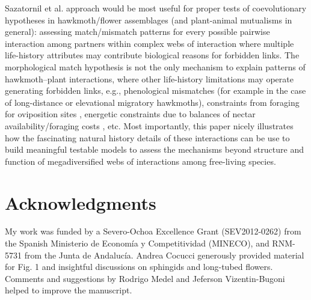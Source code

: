\documentclass[a4paper,12pt]{article}
\begin{document}
Sazatornil et al. approach would be most useful for proper tests of coevolutionary hypotheses in hawkmoth/flower assemblages (and plant-animal mutualisms in general): assessing match/mismatch patterns for every possible pairwise interaction among partners within complex webs of interaction where multiple life-history attributes may contribute biological reasons for forbidden links. The morphological match hypothesis is not the only mechanism to explain patterns of hawkmoth–plant interactions, where other life-history limitations may operate generating forbidden links, e.g., phenological mismatches (for example in the case of long-distance or elevational migratory hawkmoths), constraints from foraging for oviposition sites \citep{Alarcon:2008}, energetic constraints due to balances of nectar availability/foraging costs \citep{Borrell:2005}, etc. Most importantly, this paper nicely illustrates how the fascinating natural history details of these interactions can be use to build meaningful testable models to assess the mechanisms beyond structure and function of megadiversified webs of interactions among free-living species.


\section*{Acknowledgments}

My work was funded by a Severo-Ochoa Excellence Grant (SEV2012-0262) from the Spanish Ministerio de Econom\'ia y Competitividad (MINECO), and RNM-5731 from the Junta de Andaluc\'ia. Andrea Cocucci generously provided material for Fig. 1 and insightful discussions on sphingids and long-tubed flowers. Comments and suggestions by Rodrigo Medel and Jeferson Vizentin-Bugoni helped to improve the manuscript.

\newpage

% 
\end{document}
